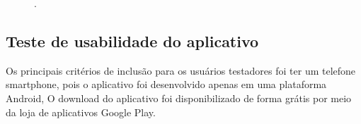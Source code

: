 \begin{figure}[H]
.
\label{figura_44}
\end{figure}


\subsection{Teste de usabilidade do aplicativo}

Os principais critérios de inclusão para os usuários testadores foi ter um telefone smartphone, pois o aplicativo foi desenvolvido apenas em uma plataforma Android, O download do aplicativo foi disponibilizado de forma grátis por meio da loja de aplicativos Google Play.

